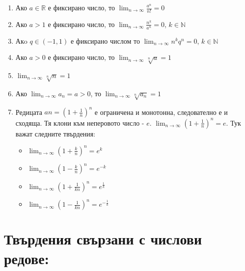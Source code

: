 \documentclass[11pt,oneside,a4paper]{article}
\begin{document}
\begin{enumerate}
    \item Ако \(a \in \mathbb{R}\) е фиксирано число, то \(\displaystyle \lim_{n \to \infty} \frac{a^n}{n!} = 0\)
    \item Ако \(a > 1\) е фиксирано число, то \(\displaystyle \lim_{n \to \infty} \frac{n^k}{a^n} = 0\), \(k \in \mathbb{N}\)
    \item Акo \(q \in (-1, 1)\) е фиксирано числом то \(\displaystyle \lim_{n \to \infty} n^kq^n = 0\), \(k \in \mathbb{N}\)
    \item Ако \(a > 0\) е фиксирано число, то \(\displaystyle \lim_{n \to \infty} \sqrt[n]{a} = 1\)
    \item \(\displaystyle \lim_{n \to \infty} \sqrt[n]{n} = 1\)
    \item Ако \(\displaystyle \lim_{n \to \infty} a_n = a > 0\), то \(\displaystyle \lim_{n \to \infty} \sqrt[n]{a_n} = 1\)
    \item Редицата \(an = (1 + \frac{1}{n})^n\) е ограничена и монотонна, следователно е и сходяща. Тя клони към неперовото число - \(e\). \(\displaystyle \lim_{n \to \infty} (1 + \frac{1}{n})^n = e\). Тук важат следните твърдения:
    \begin{itemize}
        \item \(\displaystyle \lim_{n \to \infty} (1 + \frac{k}{n})^n = e^k\) 
        \item \(\displaystyle \lim_{n \to \infty} (1 - \frac{k}{n})^n = e^{-k}\) 
        \item \(\displaystyle \lim_{n \to \infty} (1 + \frac{1}{kn})^n = e^{\frac{1}{k}}\)
        \item \(\displaystyle \lim_{n \to \infty} (1 - \frac{1}{kn})^n = e^{-\frac{1}{k}}\)
    \end{itemize}
\end{enumerate}

\section*{Твърдения свързани с числови редове:}
\end{document}

